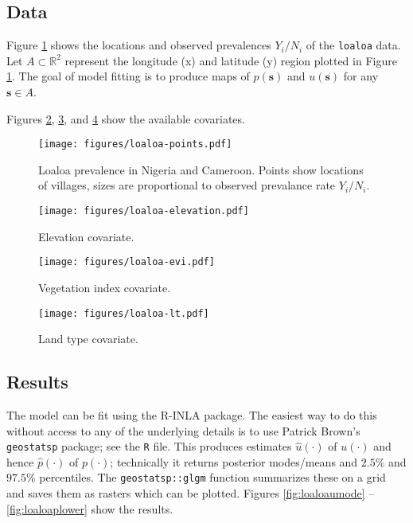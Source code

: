 \documentclass[12pt]{article}
\newcommand{\plotwidth}{6in}
\newcommand{\plotheight}{3in}
\newcommand{\Reals}{\mathbb{R}}
\newcommand{\mb}[1]{\boldsymbol{#1}}
\begin{document}
\subsection{Data}

Figure \ref{fig:loaloapoint} shows the locations and observed prevalences $Y_i/N_i$ of the \texttt{loaloa} data.
Let $A\subset\Reals^2$ represent the longitude (x) and latitude (y) region plotted in Figure \ref{fig:loaloapoint}.
The goal of model fitting is to produce maps of $p(\mb{s})$ and $u(\mb{s})$ for any $\mb{s}\in A$. 

Figures \ref{fig:loaloaelevation}, \ref{fig:loaloaevi}, and \ref{fig:loaloalt} show the available covariates.

\begin{figure}
  \centering
  \texttt{[image: figures/loaloa-points.pdf]}
  \caption{Loaloa prevalence in Nigeria and Cameroon. Points show locations of villages, sizes are proportional to observed prevalance rate $Y_i/N_i$.}
  \label{fig:loaloapoint}
\end{figure}

\begin{figure}
  \centering
  \texttt{[image: figures/loaloa-elevation.pdf]}
  \caption{Elevation covariate.}
  \label{fig:loaloaelevation}
\end{figure}

\begin{figure}
  \centering
  \texttt{[image: figures/loaloa-evi.pdf]}
  \caption{Vegetation index covariate.}
  \label{fig:loaloaevi}
\end{figure}

\begin{figure}
  \centering
  \texttt{[image: figures/loaloa-lt.pdf]}
  \caption{Land type covariate.}
  \label{fig:loaloalt}
\end{figure}

\subsection{Results}

The model can be fit using the R-INLA package. The easiest way to do this without access to any of the underlying details
is to use Patrick Brown's \texttt{geostatsp} package; see the \texttt{R} file.
This produces estimates $\widehat{u}(\cdot)$ of $u(\cdot)$ and hence $\widehat{p}(\cdot)$ of $p(\cdot)$;
technically it returns posterior modes/means and $2.5\%$ and $97.5\%$ percentiles.
The \texttt{geostatsp::glgm} function summarizes these on a grid and saves them as rasters which can be plotted.
Figures \ref{fig:loaloaumode} -- \ref{fig:loaloaplower} show the results.
\end{document}
